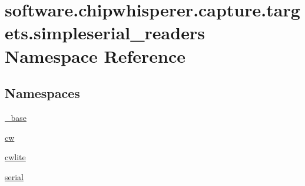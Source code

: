 \hypertarget{namespacesoftware_1_1chipwhisperer_1_1capture_1_1targets_1_1simpleserial__readers}{}\section{software.\+chipwhisperer.\+capture.\+targets.\+simpleserial\+\_\+readers Namespace Reference}
\label{namespacesoftware_1_1chipwhisperer_1_1capture_1_1targets_1_1simpleserial__readers}
\subsection*{Namespaces}
\begin{DoxyCompactItemize}
\item 
 \hyperlink{namespacesoftware_1_1chipwhisperer_1_1capture_1_1targets_1_1simpleserial__readers_1_1__base}{\+\_\+base}
\item 
 \hyperlink{namespacesoftware_1_1chipwhisperer_1_1capture_1_1targets_1_1simpleserial__readers_1_1cw}{cw}
\item 
 \hyperlink{namespacesoftware_1_1chipwhisperer_1_1capture_1_1targets_1_1simpleserial__readers_1_1cwlite}{cwlite}
\item 
 \hyperlink{namespacesoftware_1_1chipwhisperer_1_1capture_1_1targets_1_1simpleserial__readers_1_1serial}{serial}
\end{DoxyCompactItemize}
